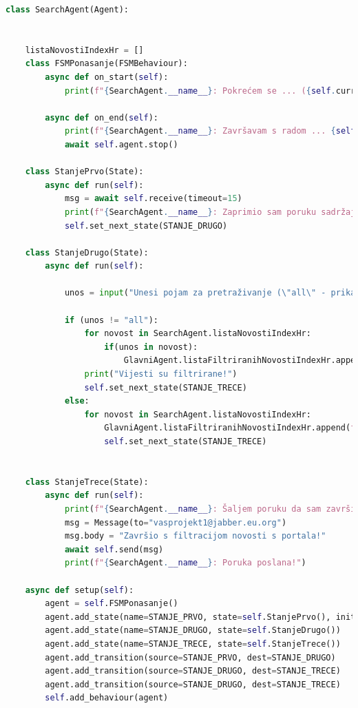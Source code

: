 \documentclass[]{foi} %
\begin{document}
\begin{lstlisting}[language=Python]
class SearchAgent(Agent):


    listaNovostiIndexHr = []
    class FSMPonasanje(FSMBehaviour):
        async def on_start(self):
            print(f"{SearchAgent.__name__}: Pokrećem se ... ({self.current_state})")

        async def on_end(self):
            print(f"{SearchAgent.__name__}: Završavam s radom ... {self.current_state}")
            await self.agent.stop()

    class StanjePrvo(State):
        async def run(self):
            msg = await self.receive(timeout=15)
            print(f"{SearchAgent.__name__}: Zaprimio sam poruku sadržaja: \"{msg.body}\"")
            self.set_next_state(STANJE_DRUGO)
            
    class StanjeDrugo(State):
        async def run(self):
            
            unos = input("Unesi pojam za pretraživanje (\"all\" - prikaz svih vijesti): ")

            if (unos != "all"):
                for novost in SearchAgent.listaNovostiIndexHr:
                    if(unos in novost):
                        GlavniAgent.listaFiltriranihNovostiIndexHr.append(novost)
                print("Vijesti su filtrirane!")
                self.set_next_state(STANJE_TRECE)
            else:
                for novost in SearchAgent.listaNovostiIndexHr:
                    GlavniAgent.listaFiltriranihNovostiIndexHr.append(f"{novost}")
                    self.set_next_state(STANJE_TRECE)


    class StanjeTrece(State):
        async def run(self):
            print(f"{SearchAgent.__name__}: Šaljem poruku da sam završio s filtriranjem novosti ...")
            msg = Message(to="vasprojekt1@jabber.eu.org")
            msg.body = "Završio s filtracijom novosti s portala!"
            await self.send(msg)
            print(f"{SearchAgent.__name__}: Poruka poslana!")   

    async def setup(self):
        agent = self.FSMPonasanje()
        agent.add_state(name=STANJE_PRVO, state=self.StanjePrvo(), initial=True)
        agent.add_state(name=STANJE_DRUGO, state=self.StanjeDrugo())
        agent.add_state(name=STANJE_TRECE, state=self.StanjeTrece())
        agent.add_transition(source=STANJE_PRVO, dest=STANJE_DRUGO)
        agent.add_transition(source=STANJE_DRUGO, dest=STANJE_TRECE)
        agent.add_transition(source=STANJE_DRUGO, dest=STANJE_TRECE)
        self.add_behaviour(agent)
\end{lstlisting}
\end{document}
